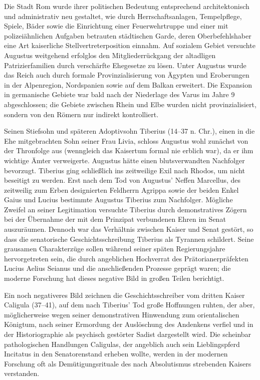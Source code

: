 Die Stadt Rom wurde ihrer politischen Bedeutung entsprechend architektonisch und administrativ neu gestaltet, wie durch Herrschaftsanlagen, Tempelpflege, Spiele, Bäder sowie die Einrichtung einer Feuerwehrtruppe und einer mit polizeiähnlichen Aufgaben betrauten städtischen Garde, deren Oberbefehlshaber eine Art kaiserliche Stellvertreterposition einnahm. Auf sozialem Gebiet versuchte Augustus weitgehend erfolglos den Mitgliederrückgang der altadligen Patrizierfamilien durch verschärfte Ehegesetze zu lösen. Unter Augustus wurde das Reich auch durch formale Provinzialisierung von Ägypten und Eroberungen in der Alpenregion, Nordspanien sowie auf dem Balkan erweitert. Die Expansion in germanische Gebiete war bald nach der Niederlage des Varus im Jahre 9 abgeschlossen; die Gebiete zwischen Rhein und Elbe wurden nicht provinzialisiert, sondern von den Römern nur indirekt kontrolliert.

Seinen Stiefsohn und späteren Adoptivsohn Tiberius (14–37 n. Chr.), einen in die Ehe mitgebrachten Sohn seiner Frau Livia, schloss Augustus wohl zunächst von der Thronfolge aus (wenngleich das Kaisertum formal nie erblich war), da er ihm wichtige Ämter verweigerte. Augustus hätte einen blutsverwandten Nachfolger bevorzugt. Tiberius ging schließlich ins zeitweilige Exil nach Rhodos, um nicht beseitigt zu werden. Erst nach dem Tod von Augustus’ Neffen Marcellus, des zeitweilig zum Erben designierten Feldherrn Agrippa sowie der beiden Enkel Gaius und Lucius bestimmte Augustus Tiberius zum Nachfolger. Mögliche Zweifel an seiner Legitimation versuchte Tiberius durch demonstratives Zögern bei der Übernahme der mit dem Prinzipat verbundenen Ehren im Senat auszuräumen. Dennoch war das Verhältnis zwischen Kaiser und Senat gestört, so dass die senatorische Geschichtsschreibung Tiberius als Tyrannen schildert. Seine grausamen Charakterzüge sollen während seiner späten Regierungsjahre hervorgetreten sein, die durch angeblichen Hochverrat des Prätorianerpräfekten Lucius Aelius Seianus und die anschließenden Prozesse geprägt waren; die moderne Forschung hat dieses negative Bild in großen Teilen berichtigt.

Ein noch negativeres Bild zeichnen die Geschichtsschreiber vom dritten Kaiser Caligula (37–41), auf dem nach Tiberius’ Tod große Hoffnungen ruhten, der aber, möglicherweise wegen seiner demonstrativen Hinwendung zum orientalischen Königtum, nach seiner Ermordung der Auslöschung des Andenkens verfiel und in der Historiographie als psychisch gestörter Sadist dargestellt wird. Die scheinbar pathologischen Handlungen Caligulas, der angeblich auch sein Lieblingspferd Incitatus in den Senatorenstand erheben wollte, werden in der modernen Forschung oft als Demütigungsrituale des nach Absolutismus strebenden Kaisers verstanden.

